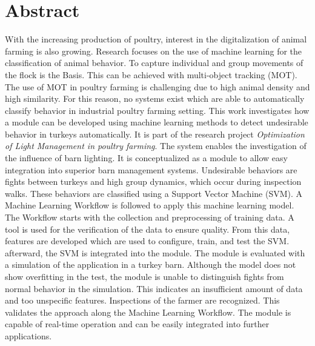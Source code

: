 \section*{Abstract}
\vspace*{-5mm}
With the increasing production of poultry, interest in the digitalization of animal farming is also growing. Research focuses on the use of machine learning for the classification of animal behavior. To capture individual and group movements of the flock is the Basis. This can be achieved with multi-object tracking (MOT). The use of MOT in poultry farming is challenging due to high animal density and high similarity. For this reason, no systems exist which are able to automatically classify behavior in industrial poultry farming setting. This work investigates how a module can be developed using machine learning methods to detect undesirable behavior in turkeys automatically. It is part of the research project \textit{Optimization of Light Management in poultry farming}. The system enables the investigation of the influence of barn lighting. It is conceptualized as a module to allow easy integration into superior barn management systems. Undesirable behaviors are fights between turkeys and high group dynamics, which occur during inspection walks. These behaviors are classified using a Support Vector Machine (SVM). A Machine Learning Workflow is followed to apply this machine learning model. The Workflow starts with the collection and preprocessing of training data. A tool is used for the verification of the data to ensure quality. From this data, features are developed which are used to  configure, train, and test the SVM. afterward, the SVM is integrated into the module. The module is evaluated with a simulation of the application in a turkey barn. Although the model does not show overfitting in the test, the module is unable to distinguish fights from normal behavior in the simulation. This indicates an insufficient amount of data and too unspecific features. Inspections of the farmer are recognized. This validates the approach along the Machine Learning Workflow. The module is capable of real-time operation and can be easily integrated into further applications.


